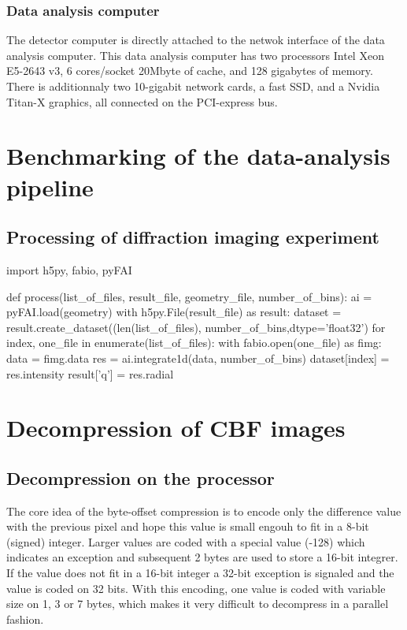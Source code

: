\documentclass[preprint, pdf]{iucr}              %
\begin{document}
\subsubsection{Data analysis computer}

The detector computer is directly attached to the netwok interface of the data
analysis computer. 
This data analysis computer has two processors Intel Xeon E5-2643 v3, 6
cores/socket 20Mbyte of cache, and 128 gigabytes of memory. 
There is additionnaly two 10-gigabit network cards, a fast SSD, and a Nvidia
Titan-X graphics, all connected on the PCI-express bus.

\section{Benchmarking of the data-analysis pipeline}

\subsection{Processing of diffraction imaging experiment}


import h5py, fabio, pyFAI

def process(list_of_files, result_file, geometry_file, number_of_bins):
    ai = pyFAI.load(geometry)
	with h5py.File(result_file) as result:
		dataset = result.create_dataset((len(list_of_files), number_of_bins,dtype='float32')
		for index, one_file in enumerate(list_of_files):
		    with fabio.open(one_file) as fimg:
		        data = fimg.data
		    res = ai.integrate1d(data, number_of_bins)
		    dataset[index] = res.intensity
	    result['q'] = res.radial


\section{Decompression of CBF images}

\subsection{Decompression on the processor}

The core idea of the byte-offset compression is to encode only the difference
value with the previous pixel and hope this value is small engouh to fit in a
8-bit (signed) integer. 
Larger values are coded with a special value (-128) which indicates an exception
and subsequent 2 bytes are used to store a 16-bit integrer. 
If the value does not fit in a 16-bit integer a 32-bit exception is signaled and
the value is coded on 32 bits. 
With this encoding, one value is coded with variable size on 1, 3 or 7 bytes,
which makes it very difficult to decompress in a parallel fashion. 
\end{document}
